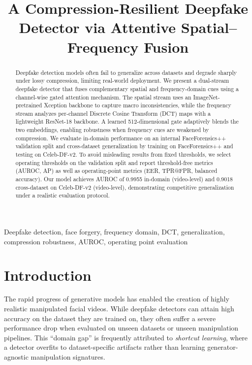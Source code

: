 \documentclass[conference]{IEEEtran}
\title{A Compression-Resilient Deepfake Detector via Attentive Spatial--Frequency Fusion}
\author{
\IEEEauthorblockN{Yash Aggarwal \hspace{1.2em} Yash Jain}
\IEEEauthorblockA{Department of Computer Science and Engineering\\
Delhi Technological University, Delhi, India\\
Email: \{author1,author2\}@dtu.ac.in}
}
\begin{document}
\maketitle

\begin{abstract}
Deepfake detection models often fail to generalize across datasets and degrade sharply under lossy compression, limiting real-world deployment. We present a dual-stream deepfake detector that fuses complementary spatial and frequency-domain cues using a channel-wise gated attention mechanism. The spatial stream uses an ImageNet-pretrained Xception backbone to capture macro inconsistencies, while the frequency stream analyzes per-channel Discrete Cosine Transform (DCT) maps with a lightweight ResNet-18 backbone. A learned 512-dimensional gate adaptively blends the two embeddings, enabling robustness when frequency cues are weakened by compression. We evaluate in-domain performance on an internal FaceForensics++ validation split and cross-dataset generalization by training on FaceForensics++ and testing on Celeb-DF-v2. To avoid misleading results from fixed thresholds, we select operating thresholds on the validation split and report threshold-free metrics (AUROC, AP) as well as operating-point metrics (EER, TPR@FPR, balanced accuracy). Our model achieves AUROC of 0.9955 in-domain (video-level) and 0.9018 cross-dataset on Celeb-DF-v2 (video-level), demonstrating competitive generalization under a realistic evaluation protocol.
\end{abstract}

\begin{IEEEkeywords}
Deepfake detection, face forgery, frequency domain, DCT, generalization, compression robustness, AUROC, operating point evaluation
\end{IEEEkeywords}

\section{Introduction}
The rapid progress of generative models has enabled the creation of highly realistic manipulated facial videos. While deepfake detectors can attain high accuracy on the dataset they are trained on, they often suffer a severe performance drop when evaluated on unseen datasets or unseen manipulation pipelines. This ``domain gap'' is frequently attributed to \emph{shortcut learning}, where a detector overfits to dataset-specific artifacts rather than learning generator-agnostic manipulation signatures.
\end{document}
